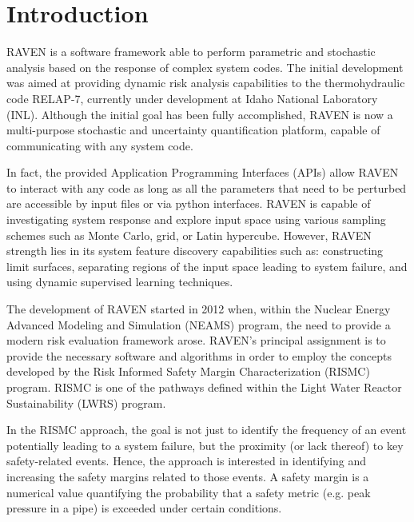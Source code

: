 \section{Introduction}

RAVEN is a software framework able to perform parametric and stochastic
analysis based on the response of complex system codes.
%
The initial development was aimed at providing dynamic risk analysis
capabilities to the thermohydraulic code RELAP-7, currently under development
at Idaho National Laboratory (INL).
%
Although the initial goal has been fully accomplished, RAVEN is now a
multi-purpose stochastic and uncertainty quantification platform, capable of
 communicating with any system code.

In fact, the provided Application Programming
Interfaces (APIs) allow RAVEN to interact with any code as long as all the parameters
that need to be perturbed are accessible by input files or via python
interfaces.
%
RAVEN is capable of investigating system response and explore input space using various
sampling schemes such as Monte Carlo, grid, or Latin hypercube.
%
However, RAVEN strength lies in its system feature discovery capabilities such as: constructing
limit surfaces, separating regions of the input space leading to system failure,
and using dynamic supervised learning techniques.

The development of RAVEN started in 2012 when, within the Nuclear Energy
Advanced Modeling and Simulation (NEAMS) program, the need to provide a modern
risk evaluation framework arose.
%
RAVEN's principal assignment is to provide the necessary software and algorithms
in order to employ the concepts developed by the Risk Informed Safety Margin
Characterization (RISMC) program.
%
RISMC is one of the pathways defined within the Light Water Reactor
Sustainability (LWRS) program.

In the RISMC approach, the goal is not just to identify the frequency of an
event potentially leading to a system failure, but the proximity (or lack
thereof) to key safety-related events.
%
Hence, the approach is interested in identifying and increasing the safety
margins related to those events.
%
A safety margin is a numerical value quantifying the probability that a safety
metric (e.g. peak pressure in a pipe) is exceeded under certain conditions.

